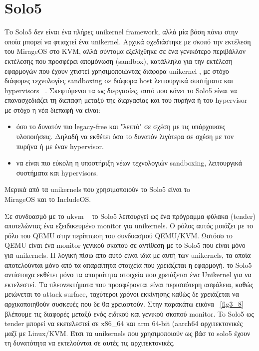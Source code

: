 \section{Solo5}

Το Solo5 δεν είναι ένα πλήρες unikernel framework, αλλά μία βάση πάνω στην οποία
μπορεί να φτιαχτεί ένα unikernel. Αρχικά σχεδιάστηκε με σκοπό την εκτέλεση του
MirageOS στο KVM, αλλά σύντομα εξελίχθηκε σε ένα γενικότερο περιβάλλον εκτέλεσης
που προσφέρει απομόνωση (sandbox), κατάλληλο για την εκτέλεση εφαρμογών που
έχουν χτιστεί χρησιμοποιώντας διάφορα unikernel , με στόχο διάφορες
τεχνολογίες sandboxing σε διάφορα host λειτουργικά συστήματα και hypervisors
~\cite{solo5_repo}. Σκεφτόμενοι τα  ως διεργασίες, αυτό που κάνει το
Solo5 είναι να επανασχεδιάζει τη διεπαφή μεταξύ της διεργασίας και του πυρήνα ή
του hypervisor ~\cite{solo5_technical} με στόχο η νέα διεπαφή να είναι: 
\begin{itemize}
	\item όσο το δυνατόν πιο legacy-free και "λεπτό" σε σχέση με τις
		υπάρχουσες υλοποιήσεις. Δηλαδή να εκθέτει όσο το δυνατόν
		λιγότερα σε σχέση με τον πυρήνα ή με έναν hypervisor.
	\item να είναι πιο εύκολη η υποστήριξη νέων τεχνολογιών sandboxing,
		λειτουργικά συστήματα και hypervisors. 
\end{itemize}
Μερικά από τα unikernels που χρησιμοποιούν το Solo5 είναι τo \\
MirageOS και το IncludeOS. 

Σε συνδυασμό με το ukvm ~\cite{williams2016unikernel} το Solo5 λειτουργεί ως ένα
πρόγραμμα φύλακα (tender) αποτελώντας ένα εξειδικευμένο monitor για unikernels.
Ο ρόλος αυτός μοιάζει με το ρόλο του QEMU στην περίπτωση του συνδυασμού
QEMU/KVM. Ωστόσο το QEMU είναι ένα monitor γενικού σκοπού σε αντίθεση με το
Solo5 που είναι μόνο για unikernels. Η λογική πίσω απο αυτό είναι ίδια με αυτή
των unikernels, τα οποία αποτελούνται μόνο από τα απαραίτητα στοιχεία που
χρειάζεται η εφαρμογή. το Solo5 αντίστοιχα εκθέτει μόνο τα απαραίτητα στοιχεία
που χρειάζεται ένα Unikernel για να εκτελεστεί. Τα πλεονεκτήματα που
προσφέρονται είναι περισσότερη ασφάλεια, καθώς μειώνεται το attack surface,
ταχύτεροι χρόνοι εκκίνησης καθώς δε χρειάζεται να αρχικοποιηθούν συσκευές που δε
θα χρειαστούν. Στην παρακάτω εικόνα ~\ref{fig3_8} βλέπουμε τις διαφορές μεταξύ
ενός ειδικού και γενικού σκοπού monitor. To Solo5 ως tender μπορεί να
εκετελεστεί σε x86\_64 και arm 64-bit (aarch64 αρχιτεκτονικές μαζί με Linux/KVM.
Έτσι τα unikernels που χρησιμοποιούν ως βάσ το solo5 έχουν τη δυνατότητα να
εκτελούνται σε αυτές τις αρχιτεκτονικές.

